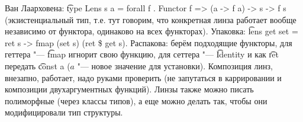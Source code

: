 Ван Лаарховена: \t{type Lens s a = forall f . Functor f => (a -> f a) -> s -> f s} (экзистенциальный тип,
т.е. тут говорим, что конкретная линза работает вообще независимо от функтора, одинаково на всех функторах).
Упаковка: \t{lens get set = \\ret s -> fmap (set s) (ret \$ get s)}.
Распакова: берём подходящие функторы, для геттера "--- \t{fmap} игнорит свою функцию,
для сеттера "--- \t{Identity} и как \t{ret} передать \t{const a} ($a$ "--- новое значение для установки).
Композиция линз, внезапно, работает, надо руками проверить (не запутаться в каррировании и композиции двухаргументных функций).
Линзы также можно писать полиморфные (через классы типов), а еще можно делать так, чтобы они модифицировали тип структуры.
